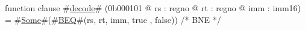 function clause #\hyperref[zdecode]{decode}# (0b000101 @ rs : regno @ rt : regno @ imm : imm16) =
  #\hyperref[zSome]{Some}#(#\hyperref[zBEQ]{BEQ}#(rs, rt, imm, true , false))  /* BNE  */
